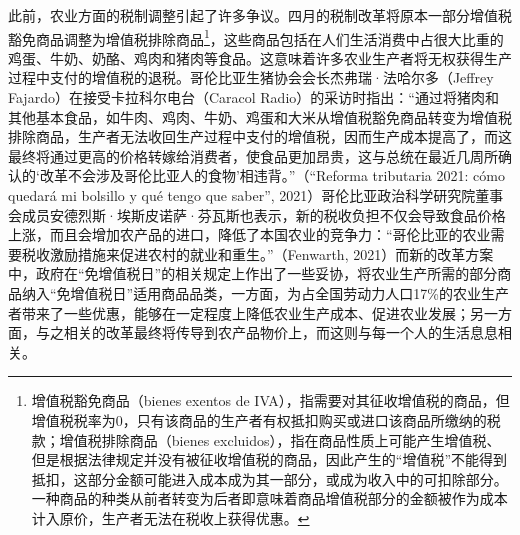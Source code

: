 \documentclass{phyasgn}\usepackage{nag}
\begin{document}
\par 此前，农业方面的税制调整引起了许多争议。四月的税制改革将原本一部分增值税豁免商品调整为增值税排除商品\footnote[28]{增值税豁免商品（bienes exentos de IVA），指需要对其征收增值税的商品，但增值税税率为0，只有该商品的生产者有权抵扣购买或进口该商品所缴纳的税款；增值税排除商品（bienes excluidos），指在商品性质上可能产生增值税、但是根据法律规定并没有被征收增值税的商品，因此产生的“增值税”不能得到抵扣，这部分金额可能进入成本成为其一部分，或成为收入中的可扣除部分。一种商品的种类从前者转变为后者即意味着商品增值税部分的金额被作为成本计入原价，生产者无法在税收上获得优惠。}，这些商品包括在人们生活消费中占很大比重的鸡蛋、牛奶、奶酪、鸡肉和猪肉等食品。这意味着许多农业生产者将无权获得生产过程中支付的增值税的退税。哥伦比亚生猪协会会长杰弗瑞·法哈尔多（Jeffrey Fajardo）在接受卡拉科尔电台（Caracol Radio）的采访时指出：“通过将猪肉和其他基本食品，如牛肉、鸡肉、牛奶、鸡蛋和大米从增值税豁免商品转变为增值税排除商品，生产者无法收回生产过程中支付的增值税，因而生产成本提高了，而这最终将通过更高的价格转嫁给消费者，使食品更加昂贵，这与总统在最近几周所确认的‘改革不会涉及哥伦比亚人的食物’相违背。”（“Reforma tributaria 2021: cómo quedará mi bolsillo y qué tengo que saber”, 2021）哥伦比亚政治科学研究院董事会成员安德烈斯·埃斯皮诺萨·芬瓦斯也表示，新的税收负担不仅会导致食品价格上涨，而且会增加农产品的进口，降低了本国农业的竞争力：“哥伦比亚的农业需要税收激励措施来促进农村的就业和重生。”（Fenwarth, 2021）而新的改革方案中，政府在“免增值税日”的相关规定上作出了一些妥协，将农业生产所需的部分商品纳入“免增值税日”适用商品品类，一方面，为占全国劳动力人口17\%的农业生产者带来了一些优惠，能够在一定程度上降低农业生产成本、促进农业发展；另一方面，与之相关的改革最终将传导到农产品物价上，而这则与每一个人的生活息息相关。
\end{document}
